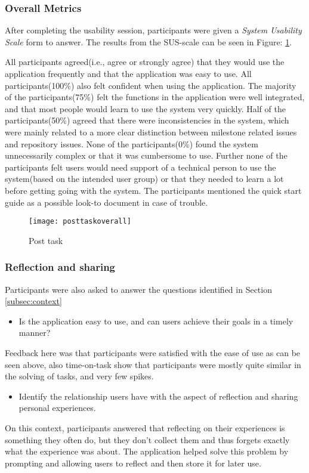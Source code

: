 \subsubsection{Overall Metrics}
After completing the usability session, participants were given a \emph{System Usability Scale} form to answer\citep{brooke1996sus}. The results from the SUS-scale can be seen in Figure: \ref{posttaskoverall}. 

All participants agreed(i.e., agree or strongly agree) that they would use the application frequently and that the application was easy to use. All participants(100\%) also felt confident when using the application. The majority of the participants(75\%) felt the functions in the application were well integrated, and that most people would learn to use the system very quickly. Half of the participants(50\%) agreed that there were inconsistencies in the system, which were mainly related to a more clear distinction between milestone related issues and repository issues. None of the participants(0\%) found the system unnecessarily complex or that it was cumbersome to use. Further none of the participants felt users would need support of a technical person to use the system(based on the intended user group) or that they needed to learn a lot before getting going with the system. The participants mentioned the quick start guide as a possible look-to document in case of trouble.  
\begin{figure}[h!]
    \centering
        \texttt{[image: posttaskoverall]}
    \caption{Post task}
    \label{posttaskoverall}
\end{figure}

\subsubsection{Reflection and sharing}
\label{subsubsec:reflection}
Participants were also asked to answer the questions identified in Section \ref{subsec:context}
\begin{itemize}
	\item Is the application easy to use, and can users achieve their goals in a timely manner?
\end{itemize}
Feedback here was that participants were satisfied with the ease of use as can be seen above, also time-on-task show that participants were mostly quite similar in the solving of tasks, and very few spikes. 
\begin{itemize}
	\item Identify the relationship users have with the aspect of reflection and sharing personal experiences.
\end{itemize}
On this context, participants answered that reflecting on their experiences is something they often do, but they don't collect them and thus forgets exactly what the experience was about. The application helped solve this problem by prompting and allowing users to reflect and then store it for later use. 

